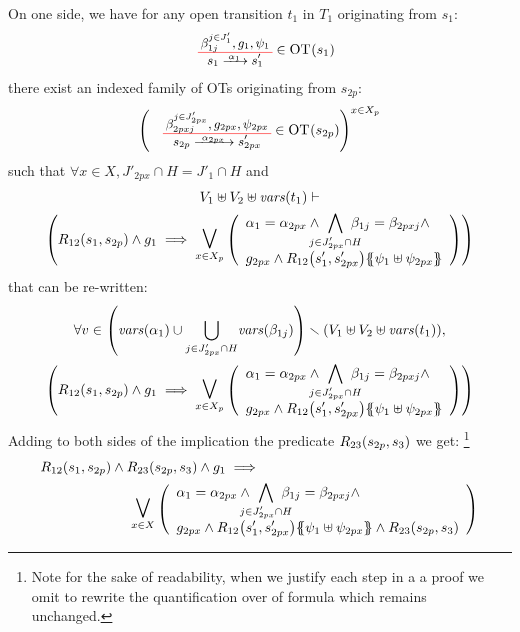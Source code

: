 \documentclass[runningheads]{llncs}
\begin{document}
\begin{enumerate}
On one side, we have for any open transition $t_1$ in $T_1$  originating from $s_1$:
\begin{align*}
\OTx{1}{}{1}{1} \in \fOT{s_1}
\end{align*}
there exist an indexed family of OTs originating from $s_{2p}$: 
\begin{align*}
\mpar{\OTx{2p}{x}{2px}{2px} \in \fOT{s_{2p}}}^{x \in X_p} 
\end{align*}
such that $\forall x \in X, J'_{2px} \cap H = J'_1 \cap H$ and
\begin{multline*}
V_1 \uplus V_2 \uplus \fvars{t_1} \vdash\\ \mpar{R_{12}\mpar{s_1, s_{2p}} \wedge g_1 \implies \operatorname*{\bigsymb{\bigvee}}_{x \in X_p} \mpar{\everymath{\displaystyle}
\begin{array}{l}
			\alpha_1 = \alpha_{2px} \wedge \bigwedge_\subbox{j \in J'_{2px} \cap H} \beta_{1j} = \beta_{2pxj} \nwedge\\
			 g_{2px} \wedge R_{12}\mpar{s'_1, s'_{2px}}\psubst{\psi_1 \uplus \psi_{2px}}
		\end{array}}} 
\end{multline*}		
that can be re-written:
\begin{multline*}
\forall v \in \mpar{\fvars{\alpha_{1}}  \cup \bigcup_{j \in J'_{2px} \cap H} \!\fvars{\beta_{1j}}} \setminus \mpar{V_1 \uplus V_2 \uplus \fvars{t_1}}, \\ \mpar{R_{12}\mpar{s_1, s_{2p}} \wedge g_1 \implies \operatorname*{\bigsymb{\bigvee}}_{x \in X_p} \mpar{\everymath{\displaystyle}
\begin{array}{l}
			\alpha_1 = \alpha_{2px} \wedge \bigwedge_\subbox{j \in J'_{2px} \cap H} \beta_{1j} = \beta_{2pxj} \nwedge\\
			 g_{2px} \wedge R_{12}\mpar{s'_1, s'_{2px}}\psubst{\psi_1 \uplus \psi_{2px}}
		\end{array}}} \\
	\end{multline*}	
\medskip
Adding to both sides of the implication the predicate $R_{23}{\left(s_{2p},s_3\right)}$ we get: \footnote{Note for the sake of readability, when we justify each step in a a proof
we omit to rewrite the quantification over of formula which remains unchanged.}
\begin{align*}
R_{12}\mpar{s_1, s_{2p}} \wedge R_{23}\mpar{s_{2p},s_3} \wedge g_1 \implies\hspace{5.5cm}\\ \operatorname*{\bigsymb{\bigvee}}_{x \in X} \mpar{\everymath{\displaystyle}
\begin{array}{l}
			\alpha_1 = \alpha_{2px} \wedge \bigwedge_\subbox{j \in J'_{2px} \cap H} \beta_{1j} = \beta_{2pxj} \land\\
			 g_{2px} \wedge R_{12}\mpar{s'_1, s'_{2px}}\psubst{\psi_1 \uplus \psi_{2px}} \land R_{23}\mpar{s_{2p},s_3}
		\end{array}} \\
\end{align*}		



\end{enumerate}
\end{document}
